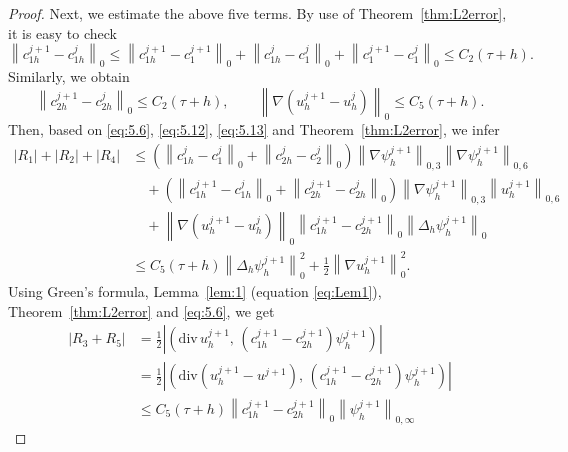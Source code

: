\documentclass[a4paper,fleqn]{cas-sc}
\numberwithin{equation}{section}
\theoremstyle{definition}
\begin{document}
\begin{proof}
Next, we estimate the above five terms. By use of Theorem~\ref{thm:L2error}, it is easy to check
\begin{equation}
  \left\|c_{1h}^{j+1} - c_{1h}^{j}\right\|_{0}
  \leq
  \left\|c_{1h}^{j+1} - c_{1}^{j+1}\right\|_{0}
  + \left\|c_{1h}^{j} - c_{1}^{j}\right\|_{0}
  + \left\|c_{1}^{j+1} - c_{1}^{j}\right\|_{0}
  \leq C_{2}(\tau + h).
  \label{eq:5.12}
\end{equation}
Similarly, we obtain
\begin{equation}
  \left\|c_{2h}^{j+1} - c_{2h}^{j}\right\|_{0}
  \leq C_{2}(\tau + h),
  \qquad
  \left\|\nabla\!\left(u_{h}^{j+1} - u_{h}^{j}\right)\right\|_{0}
  \leq C_{5}(\tau + h).
  \label{eq:5.13}
\end{equation}
Then, based on \eqref{eq:5.6}, \eqref{eq:5.12}, \eqref{eq:5.13} and
Theorem~\ref{thm:L2error}, we infer
\begin{align}
  |R_{1}| + |R_{2}| + |R_{4}|
  &\leq
  \left(\left\|c_{1h}^{j} - c_{1}^{j}\right\|_{0}
        + \left\|c_{2h}^{j} - c_{2}^{j}\right\|_{0}\right)
  \left\|\nabla\psi_{h}^{j+1}\right\|_{0,3}
  \left\|\nabla\psi_{h}^{j+1}\right\|_{0,6}
  \nonumber\\
  &\quad
  + \left(\left\|c_{1h}^{j+1} - c_{1h}^{j}\right\|_{0}
          + \left\|c_{2h}^{j+1} - c_{2h}^{j}\right\|_{0}\right)
  \left\|\nabla\psi_{h}^{j+1}\right\|_{0,3}
  \left\|u_{h}^{j+1}\right\|_{0,6}
  \nonumber\\
  &\quad
  + \left\|\nabla\!\left(u_{h}^{j+1} - u_{h}^{j}\right)\right\|_{0}
  \left\|c_{1h}^{j+1} - c_{2h}^{j+1}\right\|_{0}
  \left\|\Delta_{h}\psi_{h}^{j+1}\right\|_{0}
  \nonumber\\
  &\leq
  C_{5}(\tau + h)\left\|\Delta_{h}\psi_{h}^{j+1}\right\|_{0}^{2}
  + \frac{1}{2}\left\|\nabla u_{h}^{j+1}\right\|_{0}^{2}.
  \label{eq:5.14}
\end{align}
Using Green's formula, Lemma~\ref{lem:1} (equation \eqref{eq:Lem1}), Theorem~\ref{thm:L2error}
and \eqref{eq:5.6}, we get
\begin{align}
  |R_{3} + R_{5}|
  &= \frac{1}{2}
     \left|\left(\mathrm{div}\,u_{h}^{j+1},\,
                 (c_{1h}^{j+1} - c_{2h}^{j+1})\psi_{h}^{j+1}\right)\right|
  \nonumber\\
  &= \frac{1}{2}
     \left|\left(\mathrm{div}(u_{h}^{j+1} - u^{j+1}),\,
                 (c_{1h}^{j+1} - c_{2h}^{j+1})\psi_{h}^{j+1}\right)\right|
  \nonumber\\
  &\leq
  C_{5}(\tau + h)
  \left\|c_{1h}^{j+1} - c_{2h}^{j+1}\right\|_{0}
  \left\|\psi_{h}^{j+1}\right\|_{0,\infty}

\end{align}
\end{proof}
\end{document}
